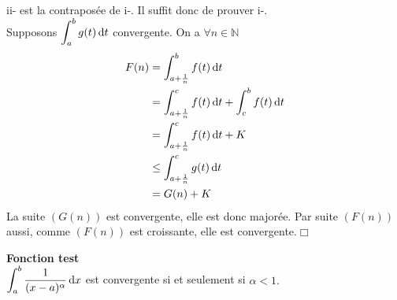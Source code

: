 \documentclass[11pt, a4paper]{book}
\newenvironment{pr}{\noindent {\bf Preuve} \noindent} {\hfill $\Box$\vskip 5mm}
\begin{document}
\begin{pr}\quad
ii- est la contrapos\'ee de i-. Il suffit donc de prouver i-.\\
Supposons ${\displaystyle \int_a^b g(t)\, \mathrm{d} t}$ convergente. On a $\forall n\in \mathbb{N}$ 
\begin{align*} F(n) &= \int_{a+\frac{1}{n}}^b f(t)\,\mathrm{d} t \\ 
&= \int_{a+\frac{1}{n}}^c f(t)\,\mathrm{d} t+\int_c^b f(t)\,\mathrm{d} t\\
&= \int_{a+\frac{1}{n}}^c f(t)\,\mathrm{d} t+K\\
&\leq \int_{a+\frac{1}{n}}^c g(t)\,\mathrm{d} t\\ 
&= G(n)+K
\end{align*}
La suite $(G(n))$ est convergente, elle est donc major\'ee. Par suite $(F(n))$ aussi, comme $(F(n))$ est croissante, elle est convergente.\end{pr} 

\textbf{Fonction test}\\
${\displaystyle \int_a^b \dfrac{1}{(x-a)^\alpha}\,\mathrm{d} x}$ est convergente si et seulement si $\alpha<1.$
\end{document}
